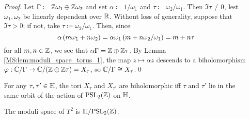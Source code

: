\documentclass[../Moduli_Spaces_of_Riemann_Surfaces.tex]{subfiles}
\begin{document}
    \begin{proof}
        Let $\Gamma\coloneqq\mathbb{Z}\omega_1\oplus\mathbb{Z}\omega_2$ and set $\alpha\coloneqq1/\omega_1$ and $\tau\coloneqq\omega_2/\omega_1$. Then $\Im\tau\neq0$, lest $\omega_1,\omega_2$ be linearly dependent over $\mathbb{R}$. Without loss of generality, suppose that $\Im\tau>0$; if not, take $\tau\coloneqq\bar{\omega_2}/\omega_1$. Then, since
        \begin{equation*}
            \alpha\left(m\omega_1+n\omega_2\right)=\alpha\omega_1\left(m+n\omega_2/\omega_1\right)=m+n\tau
        \end{equation*}
        for all $m,n\in\mathbb{Z}$, we see that $\alpha\Gamma=\mathbb{Z}\oplus\mathbb{Z}\tau$. By Lemma \ref{MS:lem:moduli_space_torus_1}, the map $z\mapsto\alpha z$ descends to a biholomorphism $\varphi:\mathbb{C}/\Gamma\to\mathbb{C}/\!\left(\mathbb{Z}\oplus\mathbb{Z}\tau\right)=X_\tau$, so $\mathbb{C}/\Gamma\cong X_\tau$.\qed
    \end{proof}
    \begin{theorem}
        For any $\tau,\tau'\in\mathbb{H}$, the tori $X_{\tau}$ and $X_{\tau'}$ are biholomorphic iff $\tau$ and $\tau'$ lie in the same orbit of the action of $\operatorname{PSL}_{2}\!\left(\mathbb{Z}\right)$ on $\mathbb{H}$.
    \end{theorem}
    \begin{corollary}\label{MS:cor:moduli_space_torus}
        The moduli space of $T^2$ is $\mathbb{H}/\!\operatorname{PSL}_{2}\!\left(\mathbb{Z}\right)$.
    \end{corollary}
\end{document}
